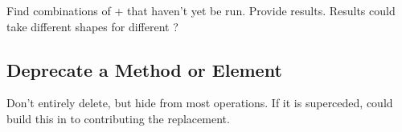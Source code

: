 Find combinations of \Method + \Element that haven't yet be run.
Provide \Performance results.
Results could take different shapes for different \Tasks?


\subsection{Deprecate a Method or Element}

Don't entirely delete, but hide from most operations.
If it is superceded, could build this in to contributing the replacement.
